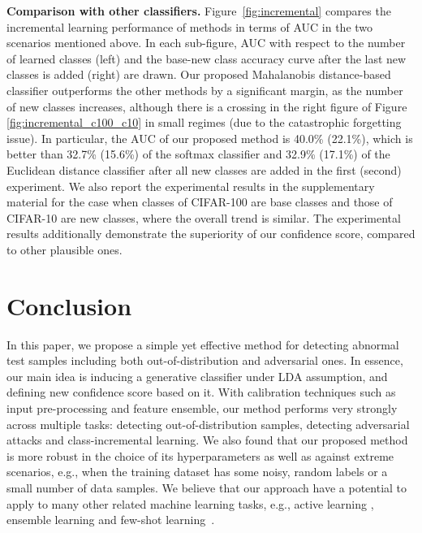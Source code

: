 \documentclass{article}
\begin{document}
{\bf Comparison with other classifiers.}
Figure~\ref{fig:incremental} compares the incremental learning performance of methods in terms of AUC in the two scenarios mentioned above.
In each sub-figure, AUC with respect to the number of learned classes (left) and the base-new class accuracy curve after the last new classes is added (right) are drawn.
Our proposed Mahalanobis distance-based classifier outperforms the other methods by a significant margin, as the number of new classes increases,
although there is a crossing in the right figure of Figure \ref{fig:incremental_c100_c10} in small regimes (due to the catastrophic forgetting issue).
In particular, the AUC of our proposed method is
40.0\% (22.1\%), which is better than
32.7\% (15.6\%) of the softmax classifier and
32.9\% (17.1\%) of the Euclidean distance classifier after all new classes are added in the first (second) experiment.
We also report the experimental results in the supplementary material for the case when classes of CIFAR-100 are base classes and those of CIFAR-10 are new classes, where the overall trend is similar.
The experimental results additionally demonstrate the superiority of our confidence score, compared to other plausible ones.









\section{Conclusion} \label{sec:conclusion}

In this paper, we propose a simple yet effective method for detecting abnormal test samples including both out-of-distribution and adversarial ones.
In essence, our main idea is inducing a generative classifier under LDA assumption, and defining new confidence score based on it.
With calibration techniques such as input pre-processing and feature ensemble, 
our method performs very strongly across multiple tasks: detecting out-of-distribution samples, detecting adversarial attacks and class-incremental learning.
We also found that our proposed method is more robust in the choice of its hyperparameters as well as against extreme scenarios, e.g., when the training dataset has some noisy, random labels or a small number of data samples.
We believe that our approach have a potential to apply to many other related machine learning tasks, e.g., 
active learning \citep{gal2017deep}, ensemble learning \citep{lee2017confident} and few-shot learning~\citep{vinyals2016matching}.
\end{document}

